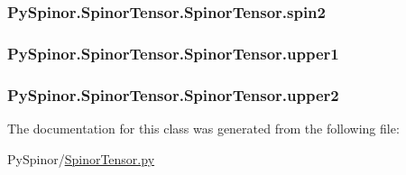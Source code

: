 \subsubsection[{spin2}]{\setlength{\rightskip}{0pt plus 5cm}Py\+Spinor.\+Spinor\+Tensor.\+Spinor\+Tensor.\+spin2}\label{class_py_spinor_1_1_spinor_tensor_1_1_spinor_tensor_a9d26b8b1a6971bb1529817fa1a93b10c}
\hypertarget{class_py_spinor_1_1_spinor_tensor_1_1_spinor_tensor_a3a080c0f125b49a6bff5225fabbf7139}{}
\subsubsection[{upper1}]{\setlength{\rightskip}{0pt plus 5cm}Py\+Spinor.\+Spinor\+Tensor.\+Spinor\+Tensor.\+upper1}\label{class_py_spinor_1_1_spinor_tensor_1_1_spinor_tensor_a3a080c0f125b49a6bff5225fabbf7139}
\hypertarget{class_py_spinor_1_1_spinor_tensor_1_1_spinor_tensor_a50ca2a0d08e4a54d50ed76a5d0ab3e95}{}
\subsubsection[{upper2}]{\setlength{\rightskip}{0pt plus 5cm}Py\+Spinor.\+Spinor\+Tensor.\+Spinor\+Tensor.\+upper2}\label{class_py_spinor_1_1_spinor_tensor_1_1_spinor_tensor_a50ca2a0d08e4a54d50ed76a5d0ab3e95}


The documentation for this class was generated from the following file\+:\begin{DoxyCompactItemize}
\item 
Py\+Spinor/\hyperlink{_spinor_tensor_8py}{Spinor\+Tensor.\+py}\end{DoxyCompactItemize}
